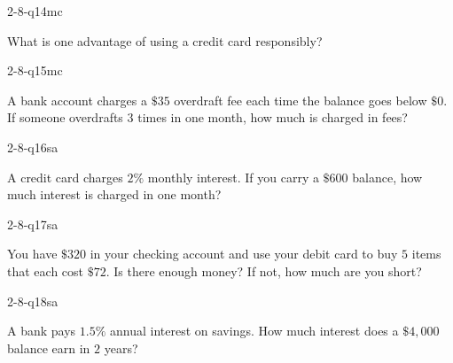 \begin{practiceQuestion}{2-8-q14}{mc}
\begin{questionText}
What is one advantage of using a credit card responsibly?
\end{questionText}
\end{practiceQuestion}

\begin{practiceQuestion}{2-8-q15}{mc}
\begin{questionText}
A bank account charges a $\$35$ overdraft fee each time the balance goes below $\$0$. If someone overdrafts $3$ times in one month, how much is charged in fees?
\end{questionText}
\end{practiceQuestion}


\begin{practiceQuestion}{2-8-q16}{sa}
\begin{questionText}
A credit card charges $2\%$ monthly interest. If you carry a $\$600$ balance, how much interest is charged in one month?
\end{questionText}
\end{practiceQuestion}

\begin{practiceQuestion}{2-8-q17}{sa}
\begin{questionText}
You have $\$320$ in your checking account and use your debit card to buy $5$ items that each cost $\$72$. Is there enough money? If not, how much are you short?
\end{questionText}
\end{practiceQuestion}

\begin{practiceQuestion}{2-8-q18}{sa}
\begin{questionText}
A bank pays $1.5\%$ annual interest on savings. How much interest does a $\$4{,}000$ balance earn in $2$ years?
\end{questionText}
\end{practiceQuestion}

